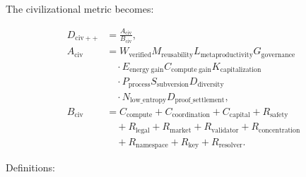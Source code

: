 The civilizational metric becomes:

\[
\begin{aligned}
D_{\mathrm{civ++}}&=\frac{A_{\mathrm{civ}}}{B_{\mathrm{civ}}},\\[0.2em]
A_{\mathrm{civ}}&=W_{\mathrm{verified}}M_{\mathrm{reusability}}L_{\mathrm{metaproductivity}}
G_{\mathrm{governance}}\\
&\quad\cdot E_{\mathrm{energy\ gain}}C_{\mathrm{compute\ gain}}K_{\mathrm{capitalization}}\\
&\quad\cdot P_{\mathrm{process}}S_{\mathrm{subversion}}D_{\mathrm{diversity}}\\
&\quad\cdot N_{\mathrm{low\_entropy}}D_{\mathrm{proof\_settlement}},\\[0.2em]
B_{\mathrm{civ}}&=C_{\mathrm{compute}}+C_{\mathrm{coordination}}+C_{\mathrm{capital}}
+R_{\mathrm{safety}}\\
&\quad+R_{\mathrm{legal}}+R_{\mathrm{market}}+R_{\mathrm{validator}}
+R_{\mathrm{concentration}}\\
&\quad+R_{\mathrm{namespace}}+R_{\mathrm{key}}+R_{\mathrm{resolver}}.
\end{aligned}
\]

Definitions:

